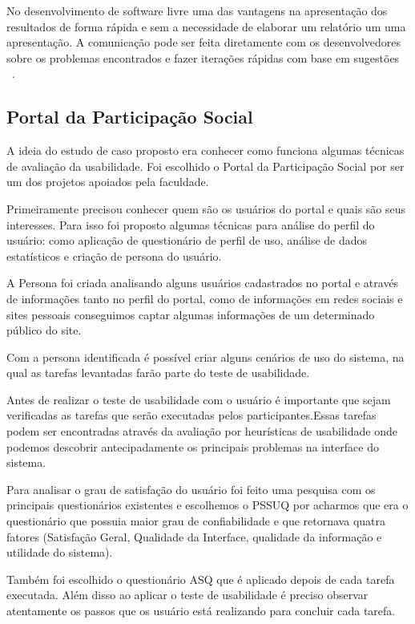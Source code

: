 	No desenvolvimento de software livre uma das vantagens na apresentação dos resultados de forma rápida e sem a necessidade de elaborar um relatório um uma apresentação. A comunicação pode ser feita diretamente com os desenvolvedores sobre os problemas encontrados e fazer iterações rápidas com base em sugestões ~\cite{borchardt2011}.



\subsection{Portal da Participação Social} 

	A ideia do estudo de caso proposto era conhecer como funciona algumas técnicas de avaliação da usabilidade. Foi escolhido o Portal da Participação Social por ser um dos projetos apoiados pela faculdade.

	Primeiramente precisou conhecer quem são os usuários do portal e quais são seus interesses. Para isso foi proposto algumas técnicas para análise do perfil do usuário: como aplicação de questionário de perfil de uso, análise de dados estatísticos e criação de persona do usuário.

	A Persona foi criada analisando alguns usuários cadastrados no portal e através de informações tanto no perfil do portal, como de informações em redes sociais e sites pessoais conseguimos captar algumas informações de um determinado público do site.

	Com a persona identificada é possível criar alguns cenários de uso do sistema, na qual as tarefas levantadas farão parte do teste de usabilidade.

	Antes de realizar o teste de usabilidade com o usuário é importante que sejam verificadas as tarefas que serão executadas pelos participantes.Essas tarefas podem ser encontradas através da avaliação por heurísticas de usabilidade onde podemos descobrir antecipadamente os principais problemas na interface do sistema.

	Para analisar o grau de satisfação do usuário foi feito uma pesquisa com os principais questionários existentes e escolhemos o PSSUQ por acharmos que era o questionário que possuia maior grau de confiabilidade e que retornava quatra fatores (Satisfação Geral, Qualidade da Interface, qualidade da informação e utilidade do sistema).

	Também foi escolhido o questionário ASQ que é aplicado depois de cada tarefa executada. Além disso ao aplicar o teste de usabilidade é preciso observar atentamente os passos que os usuário está realizando para concluir cada tarefa.

